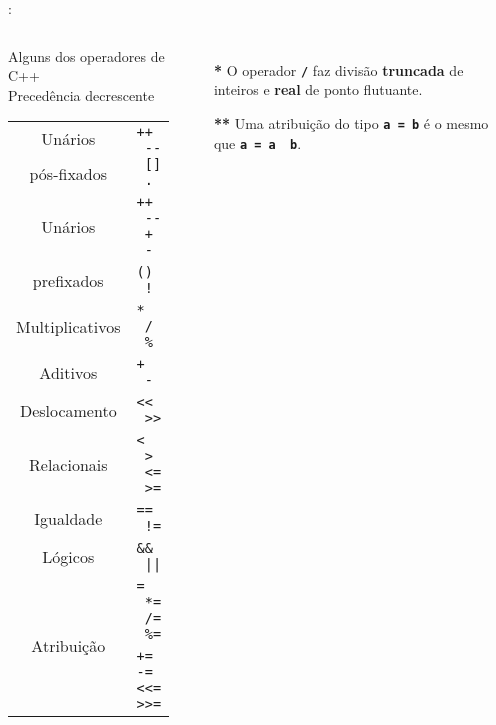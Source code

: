 \begin{frame}{\insertsection: \insertsubsection}

	\begin{columns}[b]
		\begin{block}{\centering Alguns dos operadores de C++\\{\small Precedência decrescente}}
			\begin{tabular}{cl}
				Unários      & \multirow{2}{*}{\texttt{++ \ {-}{-} \ [] \ .}} \\
				pós-fixados  &                                                \\ \hline
				Unários      & \texttt{++ \ {-}{-} \ + \ -}                   \\
				prefixados   & \texttt{(\textbf{\HighlightType{tipo}}) \ !}   \\ \hline
				Multiplicativos\Highlight{*} & \texttt{* \ / \ \%}            \\ \hline
				Aditivos     & \texttt{+ \ -}                                 \\ \hline
				Deslocamento & \texttt{{<}{<} \ {>}{>}}                       \\ \hline
				Relacionais  & \texttt{< \ > \ <= \ >=}                       \\ \hline
				Igualdade    & \texttt{== \ !=}                               \\ \hline
				Lógicos      & \texttt{\&\& \ ||}                             \\ \hline
				\multirow{2}{*}{Atribuição\Highlight{**}} & \texttt{= \ *= \ /= \ \%=} \\
				             & \texttt{+= -= <{<}= >{>}=}                     \\ %
			\end{tabular}
		\end{block}

		\begin{itemize}
			\item[\textbf{*}] O operador \textbf{\texttt{/}} faz divisão \textbf{truncada} de inteiros e \textbf{real} de ponto flutuante.
			\item[\textbf{**}] Uma atribuição do tipo \textbf{\texttt{a~=~b}} é o mesmo que \textbf{\texttt{a~=~a~~b}}.
		\end{itemize}
	\end{columns}


\end{frame}
